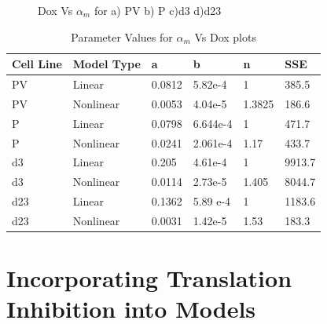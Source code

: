 \documentclass{article}
\begin{document}
\begin{figure}[h!]
\caption{Dox Vs $\alpha_m$ for a) PV b) P c)d3 d)d23}
\label{DoxVsAmPred}
\end{figure}

\begin{table}[h!]
\begin{center}
\begin{tabular}{|l|l|l|l|l|l|}
\hline
Cell Line & Model Type & a & b & n & SSE \\\hline
PV & Linear & 0.0812 & 5.82e-4 & 1 & 385.5\\\hline
PV & Nonlinear & 0.0053 & 4.04e-5 & 1.3825 & 186.6\\\hline
P & Linear & 0.0798 & 6.644e-4 & 1 & 471.7\\\hline
P & Nonlinear & 0.0241 & 2.061e-4 & 1.17 & 433.7\\\hline
d3 & Linear & 0.205 & 4.61e-4 & 1 & 9913.7\\\hline
d3 & Nonlinear & 0.0114 & 2.73e-5 & 1.405 & 8044.7\\\hline
d23 & Linear & 0.1362 & 5.89 e-4 & 1 & 1183.6 \\\hline
d23 & Nonlinear &0.0031 & 1.42e-5 & 1.53 & 183.3 \\\hline
\end{tabular}
\end{center}
\caption{Parameter Values for $\alpha_m$ Vs Dox plots}
\label{CFam}
\end{table}

\pagebreak

\section{Incorporating Translation Inhibition into Models}
\end{document}
